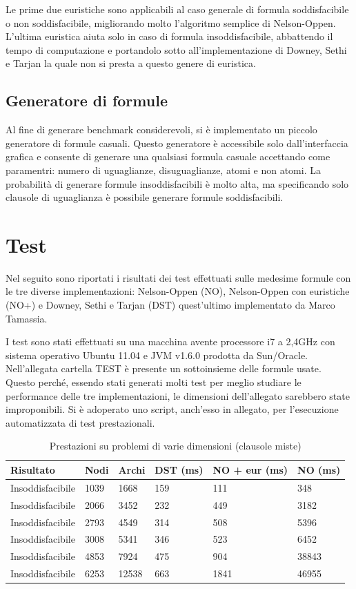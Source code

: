 \documentclass[a4paper,11pt]{article}
\begin{document}
Le prime due euristiche sono applicabili al caso generale di formula soddisfacibile o non soddisfacibile, migliorando molto l'algoritmo semplice di Nelson-Oppen.
L'ultima euristica aiuta solo in caso di formula insoddisfacibile, abbattendo il tempo di computazione e portandolo sotto all'implementazione di Downey, Sethi e Tarjan la quale non si presta a questo genere di euristica.
\subsection{Generatore di formule}
Al fine di generare benchmark considerevoli, si è implementato un piccolo generatore di formule casuali.
Questo generatore è accessibile solo dall'interfaccia grafica e consente di generare una qualsiasi formula casuale accettando come paramentri: numero di uguaglianze, disuguaglianze, atomi e non atomi.
La probabilità di generare formule insoddisfacibili è molto alta, ma specificando solo clausole di uguaglianza è possibile generare formule soddisfacibili.
\section{Test}
Nel seguito sono riportati i risultati dei test effettuati sulle medesime formule con le tre diverse implementazioni: Nelson-Oppen (NO), Nelson-Oppen con euristiche (NO+) e Downey, Sethi e Tarjan (DST) quest'ultimo implementato da Marco Tamassia.

I test sono stati effettuati su una macchina avente processore i7 a 2,4GHz con sistema operativo Ubuntu 11.04 e JVM v1.6.0 prodotta da Sun/Oracle.
Nell'allegata cartella TEST è presente un sottoinsieme delle formule usate. Questo perché, essendo stati generati molti test per meglio studiare le performance delle tre implementazioni, le dimensioni dell'allegato sarebbero state improponibili.
Si è adoperato uno script, anch'esso in allegato, per l'esecuzione automatizzata di test prestazionali.

\begin{table}[htp]
\caption{Prestazioni su problemi di varie dimensioni (clausole miste)}
\centering
\begin{tabular}{| l | l | l | l | l | l |}
\hline
Risultato & Nodi & Archi & DST (ms) & NO + eur (ms) & NO (ms) \\
\hline
Insoddisfacibile & 1039 & 1668 & 159 & 111 & 348 \\
Insoddisfacibile & 2066 & 3452 & 232 & 449 & 3182 \\
Insoddisfacibile & 2793 & 4549 & 314 & 508 & 5396 \\
Insoddisfacibile & 3008 & 5341 & 346 & 523 & 6452 \\
Insoddisfacibile & 4853 & 7924 & 475 & 904 & 38843 \\
Insoddisfacibile & 6253 & 12538 & 663 & 1841 & 46955 \\
\hline
\end{tabular}
\end{table}
\end{document}

